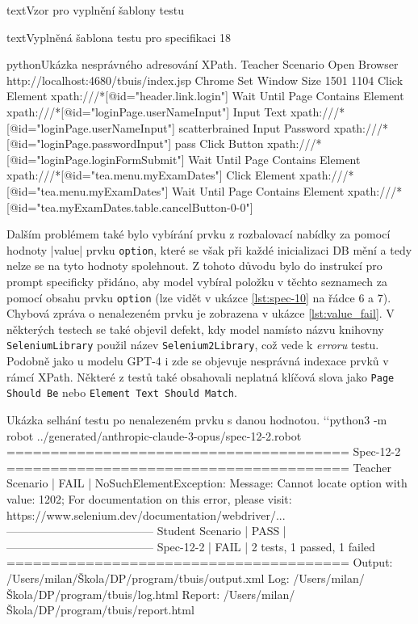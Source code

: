 \documentclass[czech, ma, kiv, he, iso690numb, pdf, viewonly]{fasthesis}
\begin{document}
\begin{code}{text}{Vzor pro vyplnění šablony testu \label{lst:template}}
{\begin{code}{text}{Vyplněná šablona testu pro specifikaci 18 \label{lst:spec18}}
{            \begin{code}{python}{Ukázka nesprávného adresování XPath. \label{lst:invalid_xpath}}
Teacher Scenario
    Open Browser    http://localhost:4680/tbuis/index.jsp    Chrome
    Set Window Size    1501    1104
    Click Element    xpath:///*[@id="header.link.login"]
    Wait Until Page Contains Element    xpath:///*[@id="loginPage.userNameInput"]
    Input Text    xpath:///*[@id="loginPage.userNameInput"]    scatterbrained
    Input Password    xpath:///*[@id="loginPage.passwordInput"]    pass
    Click Button    xpath:///*[@id="loginPage.loginFormSubmit"]
    Wait Until Page Contains Element    xpath:///*[@id="tea.menu.myExamDates"]
    Click Element    xpath:///*[@id="tea.menu.myExamDates"]
    Wait Until Page Contains Element    xpath:///*[@id="tea.myExamDates.table.cancelButton-0-0"]
            \end{code}

            Dalším problémem také bylo vybírání prvku z rozbalovací nabídky za pomocí hodnoty \varb|value| prvku \verb|option|, které se však při každé inicializaci DB mění a tedy nelze se na tyto hodnoty spolehnout. Z tohoto důvodu bylo do instrukcí pro prompt specificky přidáno, aby model vybíral položku v těchto seznamech za pomocí obsahu prvku \verb|option| (lze vidět v ukázce \ref{lst:spec-10} na řádce 6 a 7). Chybová zpráva o nenalezeném prvku je zobrazena v ukázce \ref{lst:value_fail}. V některých testech se také objevil defekt, kdy model namísto názvu knihovny \verb|SeleniumLibrary| použil název \verb|Selenium2Library|, což vede k \textit{erroru} testu. Podobně jako u modelu GPT-4 i zde se objevuje nesprávná indexace prvků v rámcí XPath. Některé z testů také obsahovali neplatná klíčová slova jako \verb|Page Should Be| nebo \verb|Element Text Should Match|.

            \begin{console}{Ukázka selhání testu po nenalezeném prvku s danou hodnotou. \label{lst:value_fail}}
`\uxprompt`python3 -m robot ../generated/anthropic-claude-3-opus/spec-12-2.robot
=======================================
Spec-12-2
=======================================
Teacher Scenario                | FAIL |
NoSuchElementException: Message: Cannot locate option with value: 1202; For documentation on this error, please visit: https://www.selenium.dev/documentation/webdriver/...
---------------------------------------
Student Scenario                | PASS |
---------------------------------------
Spec-12-2                       | FAIL |
2 tests, 1 passed, 1 failed
=======================================
Output:  /Users/milan/Škola/DP/program/tbuis/output.xml
Log:     /Users/milan/Škola/DP/program/tbuis/log.html
Report:  /Users/milan/Škola/DP/program/tbuis/report.html
            \end{console}

}
\end{code}}
\end{code}
\end{document}
